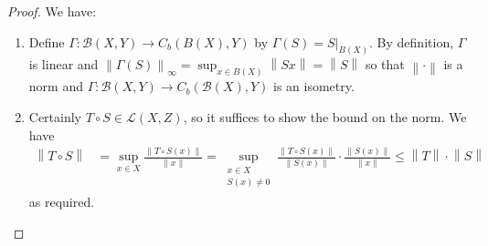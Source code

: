 \documentclass[11pt, a4paper]{memoir}
\newcommand{\norm}[1]{\ensuremath{\left\lVert#1\right\rVert}}
\theoremstyle{change}
\theoremstyle{plain}
\theoremstyle{nonumberplain}
\newtheorem{proof}{Proof}
\numberwithin{equation}{section}
\begin{document}
\begin{proof}
    We have:
    \begin{enumerate}[nl,r]
        \item Define $\Gamma:\mathcal{B}(X,Y)\to C_b(B(X),Y)$ by $\Gamma(S)=S|_{B(X)}$.
            By definition, $\Gamma$ is linear and $\norm{\Gamma(S)}_\infty=\sup_{x\in B(X)}\norm{Sx}=\norm{S}$ so that $\norm{\cdot}$ is a norm and $\Gamma:\mathcal{B}(X,Y)\to C_b(\mathcal{B}(X),Y)$ is an isometry.
        \item Certainly $T\circ S\in\mathcal{L}(X,Z)$, so it suffices to show the bound on the norm.
            We have
            \begin{align*}
                \norm{T\circ S} &=\sup_{x\in X}\frac{\norm{T\circ S(x)}}{\norm{x}}=\sup_{\substack{x\in X\\S(x)\neq 0}}\frac{\norm{T\circ S(x)}}{\norm{S(x)}}\cdot\frac{\norm{S(x)}}{\norm{x}}\leq\norm{T}\cdot\norm{S}
            \end{align*}
            as required.


\end{enumerate}
\end{proof}
\end{document}

